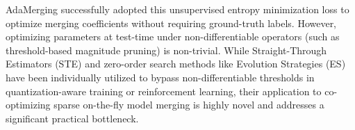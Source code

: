 AdaMerging \cite{yang2024adamerging} successfully adopted this unsupervised entropy minimization loss to optimize merging coefficients without requiring ground-truth labels. However, optimizing parameters at test-time under non-differentiable operators (such as threshold-based magnitude pruning) is non-trivial. While Straight-Through Estimators (STE) \cite{bengio2013estimating} and zero-order search methods like Evolution Strategies (ES) \cite{salimans2017evolution} have been individually utilized to bypass non-differentiable thresholds in quantization-aware training or reinforcement learning, their application to co-optimizing sparse on-the-fly model merging is highly novel and addresses a significant practical bottleneck.
